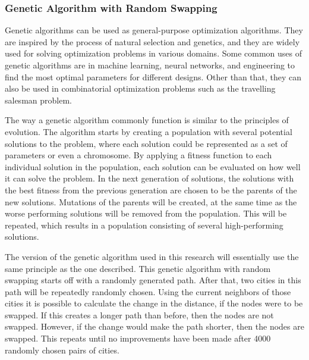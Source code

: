 \documentclass{article}
\begin{document}
\subsubsection{Genetic Algorithm with Random Swapping}\label{Random Swapping}
Genetic algorithms can be used as general-purpose optimization algorithms. They are inspired by the process of natural selection and genetics, and they are widely used for solving optimization problems in various domains. Some common uses of genetic algorithms are in machine learning, neural networks, and engineering to find the most optimal parameters for different designs. \cite{YANG202191} Other than that, they can also be used in combinatorial optimization problems such as the travelling salesman problem. 

\noindent
The way a genetic algorithm commonly function is similar to the principles of evolution. The algorithm starts by creating a population with several potential solutions to the problem, where each solution could be represented as a set of parameters or even a chromosome. By applying a fitness function to each individual solution in the population, each solution can be evaluated on how well it can solve the problem. In the next generation of solutions, the solutions with the best fitness from the previous generation are chosen to be the parents of the new solutions. Mutations of the parents will be created, at the same time as the worse performing solutions will be removed from the population. This will be repeated, which results in a population consisting of several high-performing solutions. 

\noindent
The version of the genetic algorithm used in this research will essentially use the same principle as the one described. This genetic algorithm with random swapping starts off with a randomly generated path. After that, two cities in this path will be repeatedly randomly chosen. Using the current neighbors of those cities it is possible to calculate the change in the distance, if the nodes were to be swapped. If this creates a longer path than before, then the nodes are not swapped. However, if the change would make the path shorter, then the nodes are swapped. This repeats until no improvements have been made after 4000 randomly chosen pairs of cities.
\end{document}
